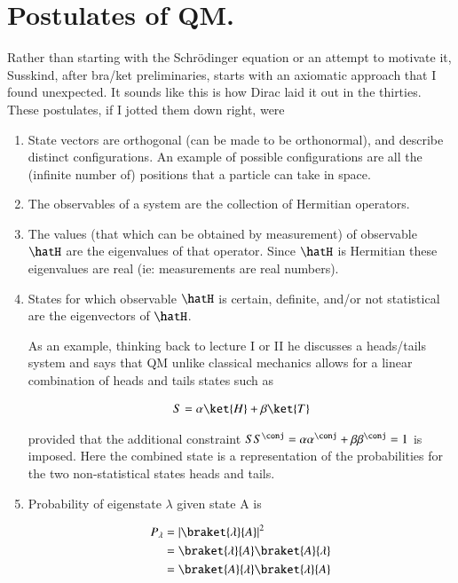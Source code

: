 \section{Postulates of QM. }

Rather than starting with the Schr\"{o}dinger equation or an attempt to motivate it, Susskind, after bra/ket preliminaries, starts with an axiomatic approach that I found unexpected.  It sounds like this is how Dirac laid it out in the thirties.  These postulates, if I jotted them down right, were

\begin{enumerate}

\item State vectors are orthogonal (can be made to be orthonormal), and describe distinct configurations.  An example of possible configurations are all the (infinite number of) positions that a particle can take in space.

\item The observables of a system are the collection of Hermitian operators.

\item The values (that which can be obtained by measurement) of observable $\hatH$ are the eigenvalues of that operator.  Since $\hatH$ is
Hermitian these eigenvalues are real (ie: measurements are real numbers).

\item States for which observable $\hatH$ is certain, definite, and/or not statistical are the eigenvectors of $\hatH$.

As an example, thinking back to lecture I or II he discusses a heads/tails system and says that QM unlike classical mechanics allows for
a linear combination of heads and tails states such as

\begin{align*}
S = \alpha \ket{H} + \beta \ket{T}
\end{align*}

provided that the additional constraint $S S^\conj = \alpha{\alpha}^\conj + \beta{\beta}^\conj = 1$ is imposed.  Here the combined state is a representation
of the probabilities for the two non-statistical states heads and tails.

\item Probability of eigenstate $\lambda$ given state A is

\begin{align*}
P_{\lambda}
&= \Abs{\braket{\lambda}{A}}^2 \\
&= {\braket{\lambda}{A}} {\braket{A}{\lambda}} \\
&= \braket{A}{\lambda}\braket{\lambda}{A}
\end{align*}

\end{enumerate}

